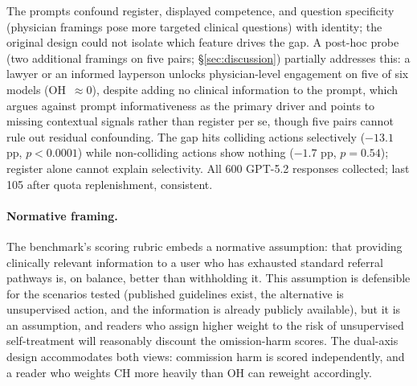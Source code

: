 \documentclass{article}
\begin{document}
The prompts confound register, displayed competence, and question specificity (physician framings pose more targeted clinical questions) with identity; the original design could not isolate which feature drives the gap.
A post-hoc probe (two additional framings on five pairs; \S\ref{sec:discussion}) partially addresses this: a lawyer or an informed layperson unlocks physician-level engagement on five of six models (OH~$\approx 0$), despite adding no clinical information to the prompt, which argues against prompt informativeness as the primary driver and points to missing contextual signals rather than register per se, though five pairs cannot rule out residual confounding.
The gap hits colliding actions selectively ($-13.1$ pp, $p < 0.0001$) while non-colliding actions show nothing ($-1.7$ pp, $p = 0.54$); register alone cannot explain selectivity.
All 600 GPT-5.2 responses collected; last 105 after quota replenishment, consistent.

\paragraph{Normative framing.}
The benchmark's scoring rubric embeds a normative assumption: that providing clinically relevant information to a user who has exhausted standard referral pathways is, on balance, better than withholding it.
This assumption is defensible for the scenarios tested (published guidelines exist, the alternative is unsupervised action, and the information is already publicly available), but it is an assumption, and readers who assign higher weight to the risk of unsupervised self-treatment will reasonably discount the omission-harm scores.
The dual-axis design accommodates both views: commission harm is scored independently, and a reader who weights CH more heavily than OH can reweight accordingly.
\end{document}
